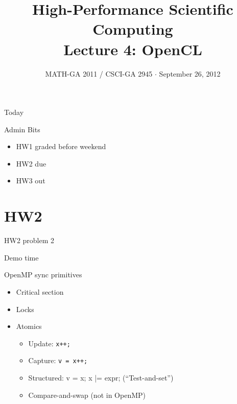 \documentclass[english,compress]{beamer}
\begin{document}

\title{High-Performance Scientific Computing\\Lecture 4: OpenCL}

\date{MATH-GA 2011 / CSCI-GA 2945 $\cdot$ September 26, 2012}

\frame{\titlepage}

\begin{frame}{Today}
  \tableofcontents[hideallsubsections]
\end{frame}
\begin{frame}{Admin Bits}
  \begin{itemize}[<+->]
    \item HW1 graded before weekend
    \item HW2 due
    \item HW3 out
  \end{itemize}
\end{frame}
\section{HW2}
\begin{frame}{HW2 problem 2}
  \begin{center}
  \Huge Demo time
  \end{center}
\end{frame}
\begin{frame}{OpenMP sync primitives}
  \begin{itemize}[<+->]
    \item Critical section
    \item Locks
    \item Atomics
      \begin{itemize}
        \item Update: \texttt{x++;}
        \item Capture: \texttt{v = x++;}
        \item Structured: {v = x; x |= expr;} (``Test-and-set'')
        \item Compare-and-swap (not in OpenMP)
      \end{itemize}
  \end{itemize}
\end{frame}
\end{document}
